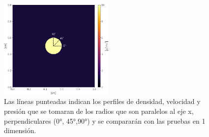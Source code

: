 \documentclass[12pt,a4paper]{book}
\begin{document}
\begin{figure}
  \centering
    \includegraphics[width=0.5\textwidth]{./Figuras/capitulo_3/pruebas_2D/Example.png}
  \caption{Las líneas punteadas indican los perfiles de densidad, velocidad y presión que se 
  tomaran de los radios que son 
  paralelos al eje x,  perpendiculares (0°, 45°,90°) y se compararán con las pruebas en 
  1 dimensión.}\label{Example_blast_wave}
\end{figure}
\end{document}
